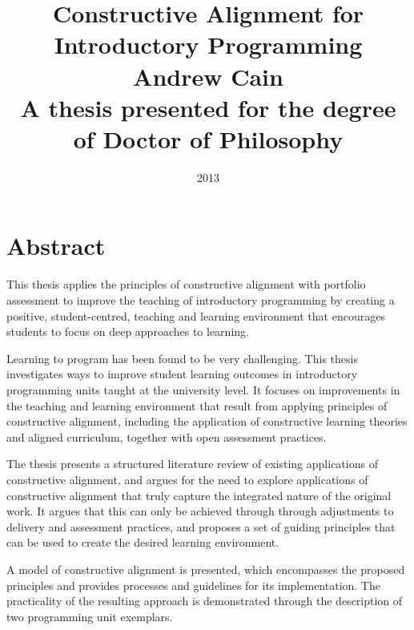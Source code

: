 
\title{ \huge{\textbf{Constructive Alignment for Introductory Programming}} \\[1.2cm]
\vspace{2.2cm} 
\Large{\textbf{Andrew Cain}} \\[1.2cm]
\vspace{2cm}
\large{A thesis presented for the degree of Doctor of Philosophy} \\
\vspace{2.5cm} 
} 

\date{2013}

\maketitle

\chapter*{Abstract}

This thesis applies the principles of constructive alignment with portfolio assessment to improve the teaching of introductory programming by creating a positive, student-centred, teaching and learning environment that encourages students to focus on deep approaches to learning.

Learning to program has been found to be very challenging. This thesis investigates ways to improve student learning outcomes in introductory programming units taught at the university level. It focuses on improvements in the teaching and learning environment that result from applying principles of constructive alignment, including the application of constructive learning theories and aligned curriculum, together with open assessment practices. 

The thesis presents a structured literature review of existing applications of constructive alignment, and argues for the need to explore applications of constructive alignment that truly capture the integrated nature of the original work. It argues that this can only be achieved through through adjustments to delivery and assessment practices, and proposes a set of guiding principles that can be used to create the desired learning environment.

A model of constructive alignment is presented, which encompasses the proposed principles and provides processes and guidelines for its implementation. The practicality of the resulting approach is demonstrated through the description of two programming unit exemplars.

